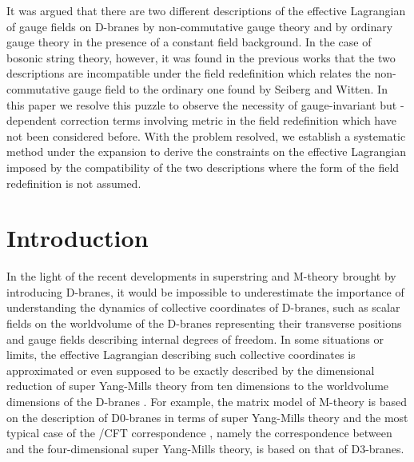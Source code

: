 \documentclass[a4paper,12pt]{article}
\begin{document}
It was argued that
there are two different descriptions of
the effective Lagrangian of gauge fields on D-branes
by non-commutative gauge theory
and by ordinary gauge theory
in the presence of a constant \coordHE{} field background.
In the case of bosonic string theory, however,
it was found in the previous works that
the two descriptions are incompatible
under the field redefinition
which relates the non-commutative gauge field 
to the ordinary one found by Seiberg and Witten.
In this paper we resolve
this puzzle to observe the necessity
of gauge-invariant but \coordHE{}-dependent correction terms
involving metric in the field redefinition
which have not been considered before.
With the problem resolved, we establish
a systematic method under the \coordHE{} expansion to derive
the constraints on the effective Lagrangian
imposed by the compatibility of the two descriptions
where the form of the field redefinition is not assumed.

\newpage
\section{Introduction}
\setcounter{equation}{0}
\indent

In the light of the recent developments in superstring and M-theory
brought by introducing D-branes,
it would be impossible to underestimate
the importance of understanding
the dynamics of collective coordinates of D-branes,
such as scalar fields on the worldvolume of the D-branes
representing their transverse positions and
gauge fields describing internal degrees of freedom.
In some situations or limits,
the effective Lagrangian describing such collective coordinates
is approximated or even supposed to be exactly described by
the dimensional reduction of super Yang-Mills theory from
ten dimensions to the worldvolume dimensions
of the D-branes \cite{bound-states, DKPS}.
For example, the matrix model of M-theory \cite{BFSS}
is based on the description of D0-branes in terms of
super Yang-Mills theory
and the most typical case
of the \coordHE{}/CFT correspondence \cite{Maldacena},
namely the correspondence between
\coordHE{} and the four-dimensional super Yang-Mills theory,
is based on that of D3-branes.
\end{document}
